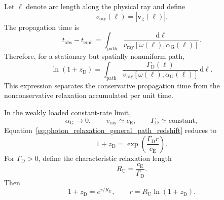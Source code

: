 Let \(\ell\) denote arc length along the physical ray and define
\begin{equation}
    v_{\mathrm{ray}}(\ell)
    =
    \left|
        \mathbf v_{\mathrm g}(\ell)
    \right|.
    \label{eq:photon_relaxation_ray_speed}
\end{equation}
The propagation time is
\begin{equation}
    t_{\mathrm{obs}}
    -
    t_{\mathrm{emit}}
    =
    \int_{\mathrm{path}}
    \frac{
        \mathrm d\ell
    }{
        v_{\mathrm{ray}}
        \left[
            \omega(\ell),
            \alpha_{\mathrm G}(\ell)
        \right]
    }.
    \label{eq:photon_relaxation_path_time}
\end{equation}
Therefore, for a stationary but spatially nonuniform path,
\begin{equation}
    \boxed{
    \ln
    \left(
        1+z_{\mathrm D}
    \right)
    =
    \int_{\mathrm{path}}
    \frac{
        \Gamma_{\mathrm D}(\ell)
    }{
        v_{\mathrm{ray}}
        \left[
            \omega(\ell),
            \alpha_{\mathrm G}(\ell)
        \right]
    }
    \,\mathrm d\ell.
    }
    \label{eq:photon_relaxation_general_path_redshift}
\end{equation}
This expression separates the conservative propagation time from the
nonconservative relaxation accumulated per unit time.

In the weakly loaded constant-rate limit,
\begin{equation}
    \alpha_{\mathrm G}
    \rightarrow
    0,
    \qquad
    v_{\mathrm{ray}}
    \simeq
    c_{\mathrm E},
    \qquad
    \Gamma_{\mathrm D}
    \simeq
    \text{constant},
    \label{eq:photon_relaxation_void_limit}
\end{equation}
Equation~\eqref{eq:photon_relaxation_general_path_redshift} reduces to
\begin{equation}
    1+z_{\mathrm D}
    =
    \exp
    \left(
        \frac{
            \Gamma_{\mathrm D}r
        }{
            c_{\mathrm E}
        }
    \right).
    \label{eq:photon_relaxation_exact_distance_redshift}
\end{equation}
For \(\Gamma_{\mathrm D}>0\), define the characteristic relaxation length
\begin{equation}
    R_{\mathrm U}
    =
    \frac{
        c_{\mathrm E}
    }{
        \Gamma_{\mathrm D}
    }.
    \label{eq:photon_relaxation_ru_definition}
\end{equation}
Then
\begin{equation}
    1+z_{\mathrm D}
    =
    e^{r/R_{\mathrm U}},
    \qquad
    r
    =
    R_{\mathrm U}
    \ln
    \left(
        1+z_{\mathrm D}
    \right).
    \label{eq:photon_relaxation_exact_euclidean_distance}
\end{equation}

